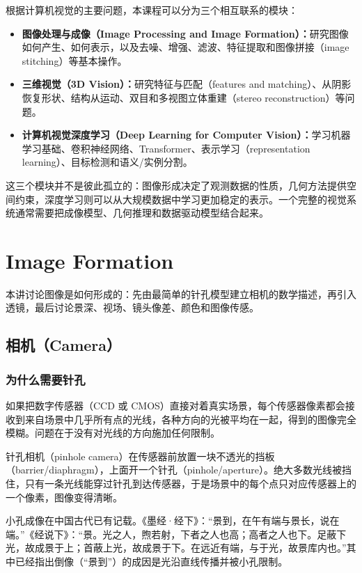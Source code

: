 \documentclass{ctexart}
\begin{document}
根据计算机视觉的主要问题，本课程可以分为三个相互联系的模块：

\begin{itemize}
    \item \textbf{图像处理与成像（Image Processing and Image Formation）：}研究图像如何产生、如何表示，以及去噪、增强、滤波、特征提取和图像拼接（image stitching）等基本操作。
    \item \textbf{三维视觉（3D Vision）：}研究特征与匹配（features and matching）、从阴影恢复形状、结构从运动、双目和多视图立体重建（stereo reconstruction）等问题。
    \item \textbf{计算机视觉深度学习（Deep Learning for Computer Vision）：}学习机器学习基础、卷积神经网络、Transformer、表示学习（representation learning）、目标检测和语义/实例分割。
\end{itemize}

这三个模块并不是彼此孤立的：图像形成决定了观测数据的性质，几何方法提供空间约束，深度学习则可以从大规模数据中学习更加稳定的表示。一个完整的视觉系统通常需要把成像模型、几何推理和数据驱动模型结合起来。



\section{Image Formation}

本讲讨论图像是如何形成的：先由最简单的针孔模型建立相机的数学描述，再引入透镜，最后讨论景深、视场、镜头像差、颜色和图像传感。

\subsection{相机（Camera）}

\subsubsection{为什么需要针孔}

如果把数字传感器（CCD 或 CMOS）直接对着真实场景，每个传感器像素都会接收到来自场景中几乎所有点的光线，各种方向的光被平均在一起，得到的图像完全模糊。问题在于没有对光线的方向施加任何限制。

针孔相机（pinhole camera）在传感器前放置一块不透光的挡板（barrier/diaphragm），上面开一个针孔（pinhole/aperture）。绝大多数光线被挡住，只有一条光线能穿过针孔到达传感器，于是场景中的每个点只对应传感器上的一个像素，图像变得清晰。

小孔成像在中国古代已有记载。《墨经·经下》：“景到，在午有端与景长，说在端。”《经说下》：“景。光之人，煦若射，下者之人也高；高者之人也下。足蔽下光，故成景于上；首蔽上光，故成景于下。在远近有端，与于光，故景库内也。”其中已经指出倒像（“景到”）的成因是光沿直线传播并被小孔限制。
\end{document}
